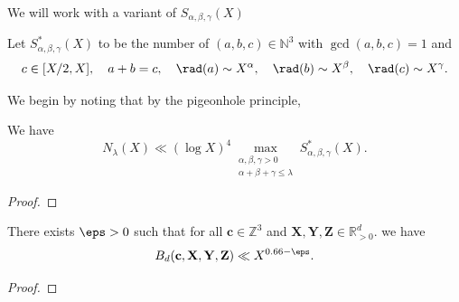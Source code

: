 We will work with a variant of $S_{\alpha,\beta,\gamma}(X)$
\begin{definition}\label{def:Sstar}
  \leanok
  Let $S^*_{\alpha,\beta,\gamma}(X)$ to be the number of $(a,b,c)\in \mathbb{N}^3$ with $\gcd(a,b,c)=1$ and
  \begin{align*}
  c\in [X/2,X],\quad a+b=c,\quad \rad(a)\sim X^{\alpha},\quad \rad(b)\sim X^{\beta},\quad \rad(c)\sim X^{\gamma}.
  \end{align*}
\end{definition}


We
 begin by noting that by the pigeonhole principle,
\begin{lemma}\label{lem:NlambdatoSstar}
  \leanok
We have
\begin{equation}\label{eq:step1}
N_\lambda(X)\ll (\log X)^4 \max_{\substack{
\alpha,\beta,\gamma>0\\ \alpha+\beta+\gamma\leq \lambda}} S^*_{\alpha,\beta,\gamma}(X).
\end{equation}
\end{lemma}
\begin{proof}
\leanok
\end{proof}






\begin{theorem}\label{thm:BdExceptionalBound}
  There exists $\eps>0$ such that for all
  $\mathbf{c}\in \mathbb{Z}^3$ and $\mathbf{X},\mathbf{Y},\mathbf{Z}\in \mathbb{R}_{>0}^{d}$. we have
\begin{align}
B_d({\bf c, X,Y,Z}) \ll  X^{0.66-\eps}.
\end{align}
\end{theorem}
\begin{proof}
\end{proof}

